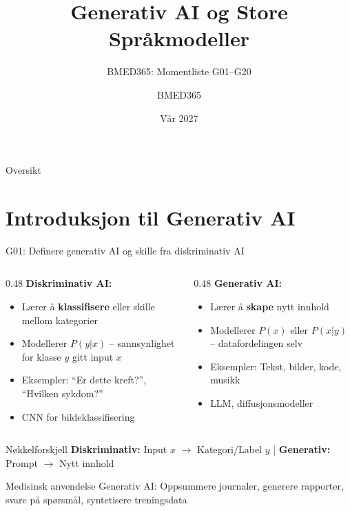 \documentclass[aspectratio=169, 10pt]{beamer}
\title{Generativ AI og Store Språkmodeller}
\subtitle{BMED365: Momentliste G01--G20}
\author{BMED365}
\date{Vår 2027}
\begin{document}
\begin{frame}
    \titlepage
\end{frame}

\begin{frame}{Oversikt}
    \tableofcontents
\end{frame}

\section{Introduksjon til Generativ AI}

\begin{frame}{G01: Definere generativ AI og skille fra diskriminativ AI}
    \begin{columns}[T]
        \begin{column}{0.48\textwidth}
            \textbf{Diskriminativ AI:}
            \begin{itemize}
                \item Lærer å \textbf{klassifisere} eller skille mellom kategorier
                \item Modellerer $P(y|x)$ -- sannsynlighet for klasse $y$ gitt input $x$
                \item Eksempler: ``Er dette kreft?'', ``Hvilken sykdom?''
                \item CNN for bildeklassifisering
            \end{itemize}
        \end{column}
        \begin{column}{0.48\textwidth}
            \textbf{Generativ AI:}
            \begin{itemize}
                \item Lærer å \textbf{skape} nytt innhold
                \item Modellerer $P(x)$ eller $P(x|y)$ -- datafordelingen selv
                \item Eksempler: Tekst, bilder, kode, musikk
                \item LLM, diffusjonsmodeller
            \end{itemize}
        \end{column}
    \end{columns}

    \vspace{0.2cm}
    \begin{block}{\footnotesize Nøkkelforskjell}
        \footnotesize
        \textbf{Diskriminativ:} Input $x$ $\rightarrow$ Kategori/Label $y$ \quad | \quad
        \textbf{Generativ:} Prompt $\rightarrow$ Nytt innhold
    \end{block}

    \begin{alertblock}{\footnotesize Medisinsk anvendelse}
        \footnotesize Generativ AI: Oppsummere journaler, generere rapporter, svare på spørsmål, syntetisere treningsdata
    \end{alertblock}
\end{frame}
\end{document}
